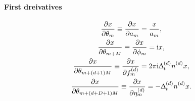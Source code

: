 \paragraph{First dreivatives}
\begin{subequations}
    \begin{gather}
        \xderiv{\theta_m} \equiv
            \xderiv{a_m} =
            \frac{x}{a_m},\\
        \xderiv{\theta_{m + M}} \equiv
            \xderiv{\phi_m} =
            \iu x,\\
        \xderiv{\theta_{m + (d + 1)M}} \equiv
            \xderiv{\fdm} =
            2 \pi \iu \Dtd \nd x,\\
        \xderiv{\theta_{m + (d + D + 1)M}} \equiv
            \xderiv{\etadm} =
            - \Dtd \nd x.
    \end{gather}
\end{subequations}
